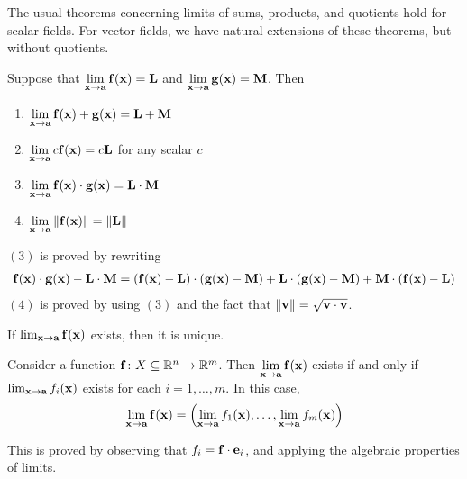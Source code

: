 \documentclass{article}
\begin{document}
The usual theorems concerning limits of sums, products, and quotients hold for scalar fields.
For vector fields, we have natural extensions of these theorems, but without quotients.
\begin{theorem}
  Suppose that $\lim\limits_{\mathbf{x} \to \mathbf{a}} \mathbf{f}(\mathbf{x}) = \mathbf{L}$ and $\lim\limits_{\mathbf{x} \to \mathbf{a}} \mathbf{g}(\mathbf{x}) = \mathbf{M}$.
  Then
  \begin{enumerate}
    \item $\lim\limits_{\mathbf{x} \to \mathbf{a}} \mathbf{f}(\mathbf{x}) + \mathbf{g}(\mathbf{x}) = \mathbf{L} + \mathbf{M}$
    \item $\lim\limits_{\mathbf{x} \to \mathbf{a}} c\mathbf{f}(\mathbf{x}) = c\mathbf{L}$ for any scalar $c$
    \item $\lim\limits_{\mathbf{x} \to \mathbf{a}} \mathbf{f}(\mathbf{x}) \cdot \mathbf{g}(\mathbf{x}) = \mathbf{L} \cdot \mathbf{M}$
    \item $\lim\limits_{\mathbf{x} \to \mathbf{a}} \norm{\mathbf{f}(\mathbf{x})} = \norm{\mathbf{L}}$
  \end{enumerate}
\end{theorem}
$(3)$ is proved by rewriting
\begin{align*}
  \mathbf{f}(\mathbf{x}) \cdot \mathbf{g}(\mathbf{x}) - \mathbf{L} \cdot \mathbf{M} = (\mathbf{f}(\mathbf{x}) - \mathbf{L}) \cdot (\mathbf{g}(\mathbf{x}) - \mathbf{M}) + \mathbf{L} \cdot (\mathbf{g}(\mathbf{x}) - \mathbf{M}) + \mathbf{M} \cdot (\mathbf{f}(\mathbf{x}) - \mathbf{L})
\end{align*}
$(4)$ is proved by using $(3)$ and the fact that $\norm{\mathbf{v}} = \sqrt{\mathbf{v} \cdot \mathbf{v}}$.

\begin{theorem}
  If $\lim_{\mathbf{x} \to \mathbf{a}} \mathbf{f}(\mathbf{x})$ exists, then it is unique.
\end{theorem}

\begin{theorem}
  Consider a function $\mathbf{f} \colon X \subseteq \mathbb{R}^n \to \mathbb{R}^m$.
  Then $\lim\limits_{\mathbf{x} \to \mathbf{a}} \mathbf{f}(\mathbf{x})$ exists if and only if $\lim_{\mathbf{x} \to \mathbf{a}} f_i(\mathbf{x})$ exists for each $i = 1, \ldots, m$.
  In this case,
  \begin{align}
    \lim_{\mathbf{x} \to \mathbf{a}} \mathbf{f}(\mathbf{x}) = \left( \lim_{\mathbf{x} \to \mathbf{a}} f_1(\mathbf{x}), \ldots, \lim_{\mathbf{x} \to \mathbf{a}} f_m(\mathbf{x}) \right)
  \end{align}
\end{theorem}
This is proved by observing that $f_i = \mathbf{f} \cdot \mathbf{e}_i$, and applying the algebraic properties of limits.
\end{document}
